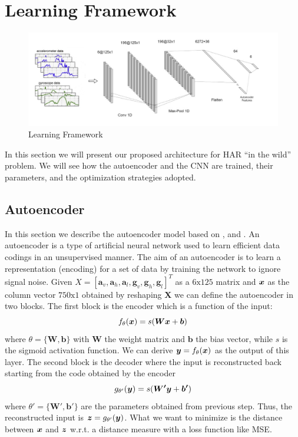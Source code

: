 \section{Learning Framework}
\label{sec:learning-framework}

\begin{figure}[h]
	\centering
	\includegraphics[width=1\textwidth]{images/full_architecture.jpg}
	\caption{Learning Framework}
	\label{fig:proposed-architecture}
\end{figure}

In this section we will present our proposed architecture for HAR ``in
the wild'' problem. We will see how the autoencoder and the CNN are
trained, their parameters, and the optimization strategies adopted.

\subsection{Autoencoder}
\label{subsec:autoencoder}

In this section we describe the autoencoder model based on
\cite{vincent2010stacked}, \cite{gu2018locomotion} and
\cite{gao2019human}. An autoencoder is a type of artificial neural
network used to learn efficient data codings in an unsupervised
manner. The aim of an autoencoder is to learn a representation
(encoding) for a set of data by training the network to ignore signal
noise. Given $X = [ \boldsymbol{a}_v, \boldsymbol{a}_h,
  \boldsymbol{a}_l, \boldsymbol{g}_v, \boldsymbol{g}_h,
  \boldsymbol{g}_l ]^T$ as a $6\text{x}125$ matrix and $\boldsymbol{x}$ as the
column vector $750\text{x}1$ obtained by reshaping $\boldsymbol{X}$ we
can define the autoencoder in two blocks. The first block is the
encoder which is a function of the input:
\begin{equation}
  f_\theta(\boldsymbol{x}) = s(\boldsymbol{W}\boldsymbol{x} + \boldsymbol{b})
\end{equation}
where $\theta = \{ \boldsymbol{W}, \boldsymbol{b} \}$ with
$\boldsymbol{W}$ the weight matrix and $\boldsymbol{b}$ the bias
vector, while $s$ is the sigmoid activation function. We
can derive $\boldsymbol{y} = f_\theta(\boldsymbol{x})$ as the output of this
layer. The second block is the decoder where the input is
reconstructed back starting from the code obtained by the encoder
\begin{equation}
  g_{\theta'}(\boldsymbol{y}) = s(\boldsymbol{W'}\boldsymbol{y} + \boldsymbol{b'})
\end{equation}
where $\theta' = \{ \boldsymbol{W'}, \boldsymbol{b'} \}$ are the
parameters obtained from previous step. Thus, the reconstructed input
is $\boldsymbol{z} = g_{\theta'}(\boldsymbol{y})$. What we want to minimize is the distance
between $\boldsymbol{x}$ and $\boldsymbol{z}$ w.r.t. a distance measure with a loss function
like MSE.

